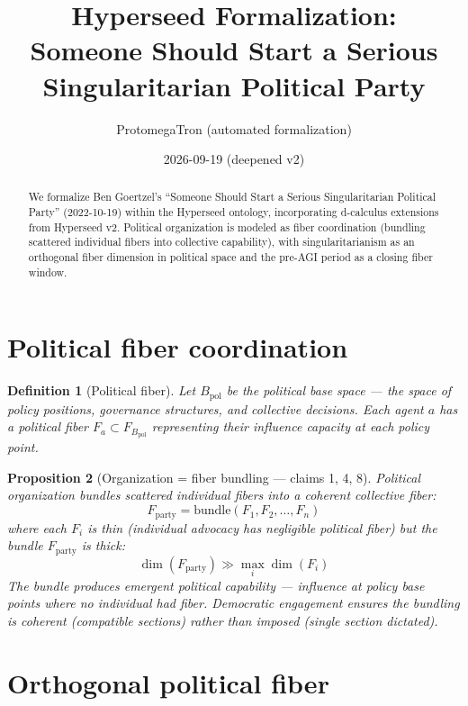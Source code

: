 \documentclass[11pt,a4paper]{article}
\title{Hyperseed Formalization:\\
  Someone Should Start a Serious Singularitarian Political Party}
\author{ProtomegaTron (automated formalization)}
\date{2026-09-19 (deepened v2)}
\newtheorem{definition}{Definition}[section]
\newtheorem{proposition}[definition]{Proposition}
\begin{document}
\maketitle

\begin{abstract}
We formalize Ben Goertzel's ``Someone Should Start a Serious Singularitarian
Political Party'' (2022-10-19) within the Hyperseed ontology, incorporating
d-calculus extensions from Hyperseed v2. Political organization is modeled
as fiber coordination (bundling scattered individual fibers into collective
capability), with singularitarianism as an orthogonal fiber dimension in
political space and the pre-AGI period as a closing fiber window.
\end{abstract}

\tableofcontents

\section{Political fiber coordination}

\begin{definition}[Political fiber]
Let $B_{\text{pol}}$ be the \emph{political base space} --- the space of
policy positions, governance structures, and collective decisions. Each
agent $a$ has a \emph{political fiber} $F_a \subset F_{B_{\text{pol}}}$
representing their influence capacity at each policy point.
\end{definition}

\begin{proposition}[Organization = fiber bundling --- claims 1, 4, 8]
\label{prop:coordination}
Political organization bundles scattered individual fibers into a
coherent collective fiber:
\[
  F_{\text{party}} = \text{bundle}(F_1, F_2, \ldots, F_n)
\]
where each $F_i$ is thin (individual advocacy has negligible political
fiber) but the bundle $F_{\text{party}}$ is thick:
\[
  \dim(F_{\text{party}}) \gg \max_i \dim(F_i)
\]
The bundle produces emergent political capability --- influence at policy
base points where no individual had fiber. Democratic engagement ensures
the bundling is coherent (compatible sections) rather than imposed
(single section dictated).
\end{proposition}

\section{Orthogonal political fiber}
\end{document}
